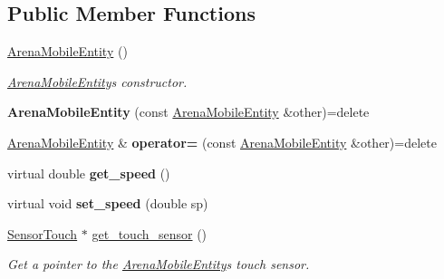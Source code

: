 \subsection*{Public Member Functions}
\begin{DoxyCompactItemize}
\item 
\mbox{\label{class_arena_mobile_entity_a6d038ac71d9b149052fc5a0fec4907f9}} 
\mbox{\hyperlink{class_arena_mobile_entity_a6d038ac71d9b149052fc5a0fec4907f9}{Arena\+Mobile\+Entity}} ()
\begin{DoxyCompactList}\small\item\em \mbox{\hyperlink{class_arena_mobile_entity}{Arena\+Mobile\+Entity}}\textquotesingle{}s constructor. \end{DoxyCompactList}\item 
\mbox{\label{class_arena_mobile_entity_ad662f3efc1a56b64ecaf5633e7ff2139}} 
{\bfseries Arena\+Mobile\+Entity} (const \mbox{\hyperlink{class_arena_mobile_entity}{Arena\+Mobile\+Entity}} \&other)=delete
\item 
\mbox{\label{class_arena_mobile_entity_a34a7f0d094515cafff7611a0f6cf4eee}} 
\mbox{\hyperlink{class_arena_mobile_entity}{Arena\+Mobile\+Entity}} \& {\bfseries operator=} (const \mbox{\hyperlink{class_arena_mobile_entity}{Arena\+Mobile\+Entity}} \&other)=delete
\item 
\mbox{\label{class_arena_mobile_entity_a2116341414a3ad0449dc03efa6ea500b}} 
virtual double {\bfseries get\+\_\+speed} ()
\item 
\mbox{\label{class_arena_mobile_entity_a1a047f4377a9557516a2e1d6d73db849}} 
virtual void {\bfseries set\+\_\+speed} (double sp)
\item 
\mbox{\label{class_arena_mobile_entity_ae9507f1b0c6bfdfd62afbab8a9a150f7}} 
\mbox{\hyperlink{class_sensor_touch}{Sensor\+Touch}} $\ast$ \mbox{\hyperlink{class_arena_mobile_entity_ae9507f1b0c6bfdfd62afbab8a9a150f7}{get\+\_\+touch\+\_\+sensor}} ()
\begin{DoxyCompactList}\small\item\em Get a pointer to the \mbox{\hyperlink{class_arena_mobile_entity}{Arena\+Mobile\+Entity}}\textquotesingle{}s touch sensor. \end{DoxyCompactList}\end{DoxyCompactItemize}
